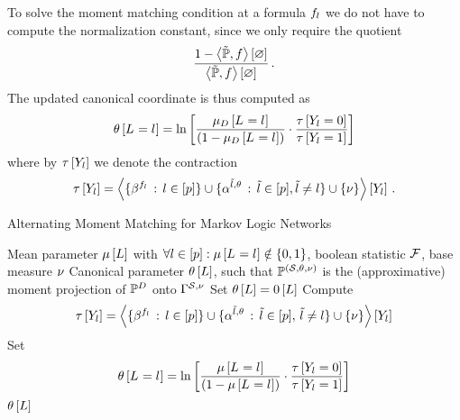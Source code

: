 To solve the moment matching condition at a formula $f_{l}$ we do not have to compute the normalization constant, since we only require the quotient
\begin{align*}
    \frac{1-\left\langle \tilde{\mathbb{P}},f\right\rangle \left[ \varnothing \right]}{\left\langle \tilde{\mathbb{P}},f\right\rangle \left[ \varnothing \right]} \, .
\end{align*}
The updated canonical coordinate is thus computed as
\begin{align}
    \label{sol:momentMatchingExformula}
    \theta\left[L_{}=l_{}\right] = \ln \left[ 
        \frac{\mu_{D}\left[L_{}=l_{}\right]}{(1-\mu_{D}\left[L_{}=l_{}\right])}
        \cdot \frac{\tau\left[Y_{l}=0\right]}{\tau\left[Y_{l}=1\right]}
     \right]
\end{align}
where by $\tau\left[Y_{l}\right]$ we denote the contraction
\begin{align*}
    \tau\left[Y_{l}\right]
    = \left\langle \{\beta^{f_{l}} \,:\, l\in[p]\}
    \cup\{\alpha^{\tilde{l},\theta} \,:\, \tilde{l} \in [p], \tilde{l}\neq l\}
    \cup\{\nu\}\right\rangle \left[ Y_{l} \right] \, .
\end{align*}


\begin{algorithm}[hbt!]
    \caption{Alternating Moment Matching for Markov Logic Networks}\label{alg:AMM_MLN}
    \begin{algorithmic}
        \Require Mean parameter $\mu\left[L\right]$ with $\forall{l\in[p]}:{\mu\left[L_{}=l_{}\right]\notin\{0,1\}}$, boolean statistic $\mathcal{F}$, base measure $\nu$
        \Ensure Canonical parameter $\theta\left[L\right]$, such that $\mathbb{P}^{(\mathcal{S},\theta,\nu)}$ is the (approximative) moment projection of $\mathbb{P}^{D}$ onto $\Gamma^{\mathcal{S},\nu}$
        \iosepline
        \State Set $\theta\left[L\right]=0\left[L\right]$
            \ForAll{$\selindex\in\secnodes$}
                \State Compute
                \begin{align*}
                    \tau\left[Y_{l}\right]
                    = \left\langle \{\beta^{f_{l}} \,:\, l\in[p]\}
                    \cup\{\alpha^{\tilde{l},\theta} \,:\, \tilde{l}\in[p],\,\tilde{l}\neq l\}
                    \cup\{\nu\}\right\rangle \left[ Y_{l} \right]
                \end{align*}
                \State Set
                \begin{align*}
                    \theta\left[L_{}=l_{}\right] = \ln \left[ 
                        \frac{\mu\left[L_{}=l_{}\right]}{(1-\mu\left[L_{}=l_{}\right])}
                        \cdot \frac{\tau\left[Y_{l}=0\right]}{\tau\left[Y_{l}=1\right]}
                     \right]
                \end{align*}
            \EndFor
        \EndWhile
        \State \Return $\theta\left[L\right]$
    \end{algorithmic}
\end{algorithm}

